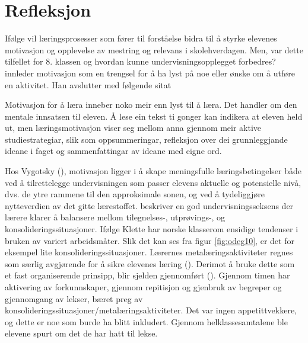 \documentclass[main.tex]{subfiles}
\begin{document}
\section*{Refleksjon}
\label{sec:3}

Ifølge  vil læringsprosesser som fører til forståelse bidra til å styrke elevenes 
motivasjon og opplevelse av mestring og relevans i skolehverdagen. Men, var dette tilfellet for 8. 
klassen og hvordan kunne undervisningsopplegget forbedres?
\newline
\newline
{} innleder motivasjon som en trengsel for å ha lyst på noe eller ønske om å 
utføre en aktivitet. Han avslutter med følgende sitat
\begin{displayquote}
Motivasjon for å læra inneber noko meir enn lyst til å læra. Det handler om den 
mentale innsatsen til eleven. Å lese ein tekst ti gonger kan indikera at eleven held ut, men  
læringsmotivasjon viser seg mellom anna gjennom meir aktive studiestrategiar, slik som 
oppsummeringar, refleksjon over dei grunnleggjande ideane i faget og sammenfattingar av ideane med 
eigne ord.
\end{displayquote}
Hos Vygotsky (), motivasjon ligger i å skape meningsfulle læringsbetingelser 
både ved å tilrettelegge undervisningen som passer elevens aktuelle og potensielle nivå, dvs. 
de ytre rammene til den approksimale sonen, og ved å tydeliggjøre nytteverdien av det gitte 
lærestoffet. 
\newline
\newline
{} beskriver en god undervisningsseksens der lærere klarer å balansere mellom 
tilegnelses-, utprøvings-, og konsolideringssituasjoner. Ifølge Klette har norske klasserom ensidige 
tendenser i bruken av variert arbeidsmåter. Slik det kan ses fra figur \ref{fig:odeg10}, er det for 
eksempel lite konsolideringssituasjoner. Lærernes metalæringsaktiviteter regnes som særlig 
avgjørende for å sikre elevenes læring (). Derimot å bruke dette som et fast
organiserende prinsipp, blir sjelden gjennomført (). Gjennom timen har 
aktivering av forkunnskaper, gjennom repitisjon og gjenbruk av begreper og gjennomgang av 
lekser, bæret preg av konsolideringssituasjoner/metalæringsaktiviteter. Det var ingen 
appetittvekkere, og dette er noe som burde ha blitt inkludert.
\newline
\newline
Gjennom helklassesamtalene ble elevene spurt om det de har hatt til lekse.
\end{document}
